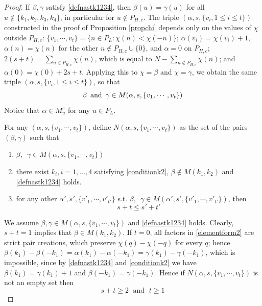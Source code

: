 \documentclass[11pt]{article}
\numberwithin{equation}{section}
\newcommand{\beq}{\begin{equation}}
\newcommand{\eeq}{\end{equation}}
\newcommand\rmand{ \,\,\,{\rm and}\,\,\, }
\newcommand\al{{\alpha}}
\newcommand\be{\beta}
\theoremstyle{definition}
\begin{document}
\begin{proof}
If $\be, \gamma$ satisfy \eqref{defnastk1234}, then $\be(u)=\gamma(u)$ for all $u\notin\{k_1,k_2,k_3,k_4\}$, in particular for $u\notin P_{H,c}$. 
The triple $(\al, s, \{v_i,1\leq i\leq t\})$ constructed in the proof of  Proposition \ref{propchi} depends only on the values of $\chi$ outside $P_{H,c}$: $\{v_1,\cdots,v_t\}=\{n\in P_L: \chi(n)<\chi(-n)\}$; $\al(v_i)=\chi(v_i)+1$, $\al(n)=\chi(n)$ for the other $n\notin P_{H,c}\cup\{0\}$, and $\al=0$ on $P_{H,c}$; $2(s+t)=\sum_{n\in P_{H,c}}\chi(n)$, which is equal to $N-\sum_{n\notin P_{H,c}}\chi(n)$; and $\al(0)=\chi(0)+2s+t$. Applying this to $\chi=\be$ and $\chi=\gamma$, we obtain the same triple $(\al, s, \{v_i,1\leq i\leq t\})$, so that
\beq
\be\rmand \gamma\in M(\al, s, \{v_1,\cdots,v_t\})
\eeq
Notice that $\al\in M_u^s$ for any $u\in P_L$. 

For any $(\al,s,\{v_1,\cdots,v_t\})$, define $N(\al,s,\{v_1,\cdots,v_t\})$ as the set of the pairs $(\beta,\gamma)$ such that 
\begin{enumerate}
	\item $\be,\,\,\,\gamma\in M(\al,s,\{v_1,\cdots,v_t\})$
	\item there exist $k_i, i=1, \ldots , 4$ satisfying \eqref{conditionk2}, $\be\notin M(k_1,k_2)$ and \eqref{defnastk1234} holds. 
\item for any other  $\al',s',\{v'_1,\cdots,v'_{t'}\}$ s.t.  $\be,\,\,\,\gamma\in M(\al',s',\{v'_1,\cdots,v'_{t'}\})$, then
\beq\label{stst}
s+t\leq s'+t' 
\eeq
\end{enumerate}
We assume $\be, \gamma\in M(\al,s,\{v_1,\cdots,v_t\})$ and \eqref{defnastk1234} holds. Clearly,  $s+t=1$ implies that  $\be\in M(k_1,k_2)$. 
If $t=0$, all factors in \eqref{elementform2} are strict pair creations, which preserve $\chi(q)-\chi(-q)$ for every $q$; hence $\be(k_1)-\be(-k_1)=\al(k_1)-\al(-k_1)=\gamma(k_1)-\gamma(-k_1)$, which is impossible, since by \eqref{defnastk1234} and \eqref{conditionk2} we have $\be(k_1)=\gamma(k_1)+1$ and $\be(-k_1)=\gamma(-k_1)$. 
Hence if $N(\al,s,\{v_1,\cdots,v_t\}) $ is not an empty set then 
\beq\label{stgeq2}
s+t\geq 2 \;  \text { and } \;
t\geq 1
\eeq 


\end{proof}
\end{document}
